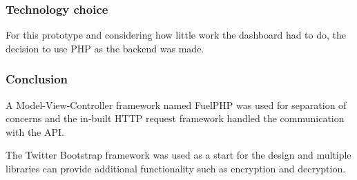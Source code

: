 \subsubsection{Technology choice}

For this prototype and considering how little work the dashboard had to do, the decision to use PHP as the backend was made.


\subsubsection{Conclusion}
A Model-View-Controller framework named FuelPHP was used for separation of concerns and the in-built HTTP request framework handled the communication with the API.

The Twitter Bootstrap framework was used as a start for the design and multiple libraries can provide additional functionality such as encryption and decryption.

\newpage